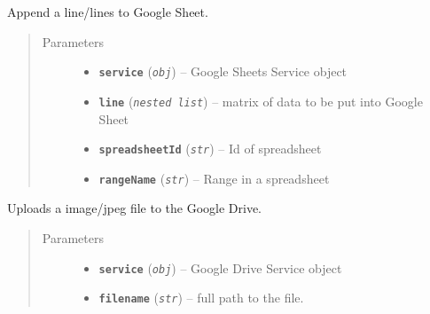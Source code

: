 \documentclass[letterpaper,10pt,english,openany]{sphinxmanual}
\begin{document}
\begin{fulllineitems}
\begin{fulllineitems}
\begin{description}
\end{description}

\end{fulllineitems}


\begin{fulllineitems}
\label{index:rpicameramon.telemetry.GoogleHandler.add_sheet_line}
Append a line/lines to Google Sheet.
\begin{quote}\begin{description}
\item[{Parameters}] \leavevmode\begin{itemize}
\item {} 
\textbf{\texttt{service}} (\emph{\texttt{obj}}) -- Google Sheets Service object

\item {} 
\textbf{\texttt{line}} (\emph{\texttt{nested list}}) -- matrix of data to be put into Google Sheet

\item {} 
\textbf{\texttt{spreadsheetId}} (\emph{\texttt{str}}) -- Id of spreadsheet

\item {} 
\textbf{\texttt{rangeName}} (\emph{\texttt{str}}) -- Range in a spreadsheet

\end{itemize}

\end{description}\end{quote}

\end{fulllineitems}


\begin{fulllineitems}
\label{index:rpicameramon.telemetry.GoogleHandler.upload_file}
Uploads a image/jpeg file to the Google Drive.
\begin{quote}\begin{description}
\item[{Parameters}] \leavevmode\begin{itemize}
\item {} 
\textbf{\texttt{service}} (\emph{\texttt{obj}}) -- Google Drive Service object

\item {} 
\textbf{\texttt{filename}} (\emph{\texttt{str}}) -- full path to the file.

\end{itemize}

\end{description}\end{quote}

\end{fulllineitems}


\end{fulllineitems}
\end{document}
